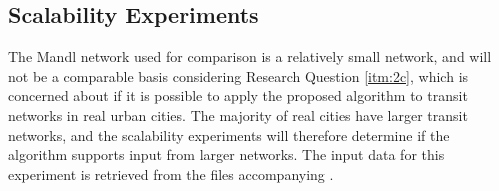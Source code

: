 \subsection{Scalability Experiments}
The Mandl network used for comparison is a relatively small network, and will not be a comparable basis considering Research Question \vref{itm:2c}, which is concerned about if it is possible to apply the proposed algorithm to transit networks in real urban cities. The majority of real cities have larger transit networks, and the scalability experiments will therefore determine if the algorithm supports input from larger networks. The input data for this experiment is retrieved from the files accompanying \citet{mumford13}.


